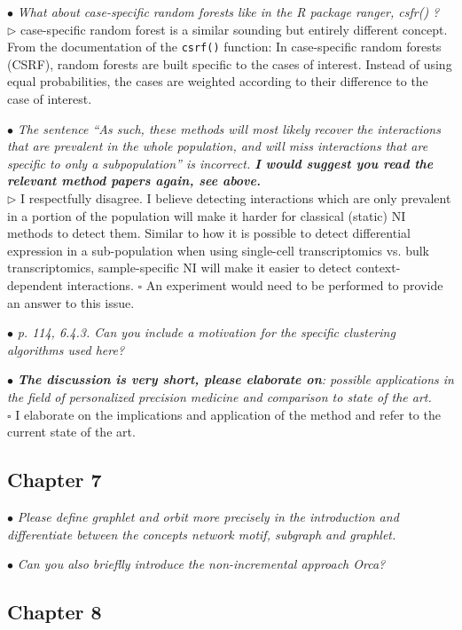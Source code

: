 \documentclass[10pt]{article}
\newcommand{\todo}{$\square$}
\newcommand{\exam}[2][\  ]{\hspace{0pt}\marginpar{\color{myred}#1}$\bullet$ \textit{#2}}
\newcommand{\imp}[1]{\textbf{#1}}
\newcommand{\answ}[1]{{\color{myblue} $\triangleright$ #1}}
\newcommand{\task}[2][\todo]{{\color{myblue} #1 #2}}
\newcommand{\bigexclaim}{\raisebox{-0.1em}{\BigTriangleUp}\hspace{-0.32em}\llap{\small\textbf{!}}\hspace{0.32em}}
\newcommand{\tagimp}{\bigexclaim}
\newcommand{\tagtime}{{\Large $\hourglass$}}
\begin{document}
\exam{What about case-specific random forests like in the R package ranger, csfr() ?} \\
\answ{case-specific random forest is a similar sounding but entirely different concept. From the documentation of the \texttt{csrf()} function: In case-specific random forests (CSRF), random forests are built specific to the cases of interest. Instead of using equal probabilities, the cases are weighted according to their difference to the case of interest.}

\exam[\tagimp]{The sentence “As such, these methods will most likely recover the interactions that are
	prevalent in the whole population, and will miss interactions that are specific to only a subpopulation” is incorrect. \imp{I would suggest you read the relevant method papers again, see
	above.}} \\
\answ{I respectfully disagree. I believe detecting interactions which are only prevalent in a portion of the population will make it harder for classical (static) NI methods to detect them. Similar to how it is possible to detect differential expression in a sub-population when using single-cell transcriptomics vs. bulk transcriptomics, sample-specific NI will make it easier to detect context-dependent interactions. }
\task{An experiment would need to be performed to provide an answer to this issue. }

\exam{p. 114, 6.4.3. Can you include a motivation for the specific clustering algorithms used here?}

\exam[\tagimp \tagtime]{\imp{The discussion is very short, please elaborate on}: possible applications in the field of personalized precision medicine and comparison to state of the art.} \\
\task{I elaborate on the implications and application of the method and refer to the current state of the art.}


\subsection{Chapter 7}

\exam{Please define graphlet and orbit more precisely in the introduction and differentiate between
	the concepts network motif, subgraph and graphlet.}

\exam{Can you also brieflly introduce the non-incremental approach Orca?}

\subsection{Chapter 8}
\end{document}
